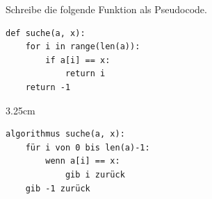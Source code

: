 \question[3]
Schreibe die folgende Funktion als Pseudocode.
\begin{lstlisting}
def suche(a, x):
    for i in range(len(a)):
        if a[i] == x:
            return i
    return -1
\end{lstlisting}
\begin{solutionbox}{3.25cm}
\begin{lstlisting}[language={}]
algorithmus suche(a, x):
    für i von 0 bis len(a)-1:
        wenn a[i] == x:
            gib i zurück
    gib -1 zurück
\end{lstlisting}
\end{solutionbox}
